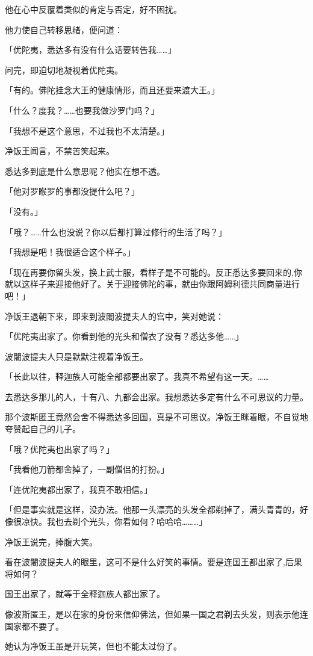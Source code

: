 \documentclass[twoside,openany]{book}
\begin{document}
他在心中反覆着类似的肯定与否定，好不困扰。

他力使自己转移思绪，便问道：

「优陀夷，悉达多有没有什么话要转告我……」

问完，即迫切地凝视着优陀夷。

「有的。佛陀挂念大王的健康情形，而且还要来渡大王。」

「什么？度我？……也要我做沙罗门吗？」

「我想不是这个意思，不过我也不太清楚。」

净饭王闻言，不禁苦笑起来。

悉达多到底是什么意思呢？他实在想不透。

「他对罗睺罗的事都没提什么吧？」

「没有。」

「哦？……什么也没说？你以后都打算过修行的生活了吗？」

「我想是吧！我很适合这个样子。」

「现在再要你留头发，换上武士服，看样子是不可能的。反正悉达多要回来的,你就以这样子来迎接他好了。关于迎接佛陀的事，就由你跟阿姆利德共同商量进行吧！」

净饭王退朝下来，即来到波闍波提夫人的宫中，笑对她说：

「优陀夷出家了。你看到他的光头和僧衣了没有？悉达多他……」

波闍波提夫人只是默默注视着净饭王。

「长此以往，释迦族人可能全部都要出家了。我真不希望有这一天。……

去悉达多那儿的人，十有八、九都会出家。我想悉达多定有什么不可思议的力量。

那个波斯匿王竟然会舍不得悉达多回国，真是不可思议。净饭王眯着眼，不自觉地夸赞起自己的儿子。

「哦？优陀夷也出家了吗？」

「我看他刀箭都舍掉了，一副僧侣的打扮。」

「连优陀夷都出家了，我真不敢相信。」

「但是事实就是这样，没办法。他那一头漂亮的头发全都剃掉了，满头青青的，好像很凉快。我也去剃个光头，你看如何？哈哈哈………」

净饭王说完，捧腹大笑。

看在波闍波提夫人的眼里，这可不是什么好笑的事情。要是连国王都出家了,后果将如何？

国王出家了，就等于全释迦族人都出家了。

像波斯匿王，是以在家的身份来信仰佛法，但如果一国之君剃去头发，则表示他连国家都不要了。

她认为净饭王虽是开玩笑，但也不能太过份了。
\end{document}
